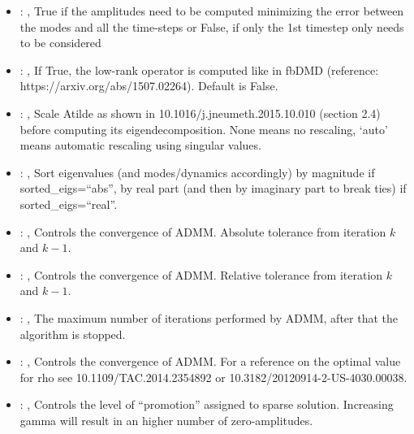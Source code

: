 \begin{itemize}
    \item {}: ,
      True if the amplitudes need to be computed minimizing the error
      between the modes and all the time-steps or False, if only the 1st timestep only needs to be
      considered

    \item {}: ,
      If True, the low-rank operator is computed like in fbDMD (reference:
      https://arxiv.org/abs/1507.02264).                                                  Default is
      False.

    \item {}: ,
      Scale Atilde as shown in 10.1016/j.jneumeth.2015.10.010 (section 2.4) before computing its
      eigendecomposition. None means no rescaling, ‘auto’ means automatic rescaling using singular
      values.

    \item {}: ,
      Sort eigenvalues (and modes/dynamics accordingly) by magnitude if sorted\_eigs=``abs'',
      by real part (and then by imaginary part to break ties) if sorted\_eigs=``real''.

    \item {}: ,
      Controls the convergence of ADMM. Absolute tolerance from iteration $k$ and $k-1$.

    \item {}: ,
      Controls the convergence of ADMM. Relative tolerance from iteration $k$ and $k-1$.

    \item {}: ,
      The maximum number of iterations performed by ADMM, after that the algorithm is stopped.

    \item {}: ,
      Controls the convergence of ADMM. For a reference on the optimal value for rho see
      10.1109/TAC.2014.2354892 or 10.3182/20120914-2-US-4030.00038.

    \item {}: ,
      Controls the level of “promotion” assigned to sparse solution. Increasing gamma will
      result in an higher number of zero-amplitudes.


\end{itemize}
